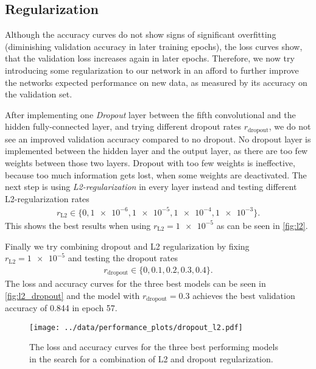 \subsection{Regularization}
Although the accuracy curves do not show signs of significant overfitting (diminishing validation accuracy in later training epochs), the loss curves show, that the validation loss 
increases again in later epochs. 
Therefore, we now try introducing some regularization to our network in an afford to further improve the networks expected performance on new data, as measured by its accuracy on the validation set.

After implementing one \textit{Dropout} layer between the fifth convolutional and the hidden fully-connected layer, and trying different dropout rates $r_\text{dropout}$, we do not see an 
improved validation accuracy compared to no dropout.
No dropout layer is implemented between the hidden layer and the output layer, as there are too few weights between those two layers.
Dropout with too few weights is ineffective, because too much information gets lost, when some weights are deactivated.
The next step is using \textit{L2-regularization} in every layer instead and testing different L2-regularization rates
\begin{align}
    r_\text{L2} \in \{0, \num{1e-6}, \num{1e-5}, \num{1e-4}, \num{1e-3}\}.
\end{align}
This shows the best results when using $r_\text{L2} = \num{1e-5}$ as can be seen in \autoref{fig:l2}.

Finally we try combining dropout and L2 regularization by fixing $r_\text{L2} = \num{1e-5}$ and testing the dropout rates
\begin{align}
    r_\text{dropout} \in \{0, 0.1, 0.2, 0.3, 0.4\}.
\end{align}
The loss and accuracy curves for the three best models can be seen in \autoref{fig:l2_dropout} and the model with $r_\text{dropout} = 0.3$ achieves the best validation accuracy
of 0.844 in epoch 57.
\begin{figure}
    \centering
    \texttt{[image: ../data/performance\_plots/dropout\_l2.pdf]}
    \caption{The loss and accuracy curves for the three best performing models in the search for a combination of L2 and dropout regularization.}
    \label{fig:l2_dropout}
\end{figure}
